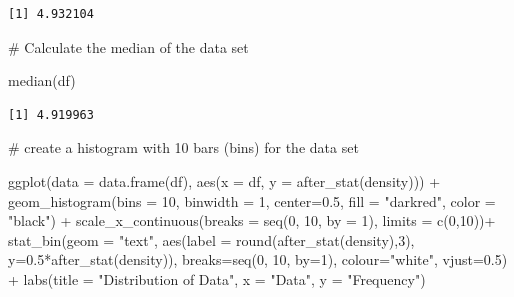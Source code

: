 \documentclass[
  letterpaper,
  DIV=11,
  numbers=noendperiod]{scrreprt}
\newenvironment{Shaded}{\begin{snugshade}}{\end{snugshade}}
\newcommand{\AttributeTok}[1]{\textcolor[rgb]{0.40,0.45,0.13}{#1}}
\newcommand{\CommentTok}[1]{\textcolor[rgb]{0.37,0.37,0.37}{#1}}
\newcommand{\DecValTok}[1]{\textcolor[rgb]{0.68,0.00,0.00}{#1}}
\newcommand{\FloatTok}[1]{\textcolor[rgb]{0.68,0.00,0.00}{#1}}
\newcommand{\FunctionTok}[1]{\textcolor[rgb]{0.28,0.35,0.67}{#1}}
\newcommand{\NormalTok}[1]{\textcolor[rgb]{0.00,0.23,0.31}{#1}}
\newcommand{\SpecialCharTok}[1]{\textcolor[rgb]{0.37,0.37,0.37}{#1}}
\newcommand{\StringTok}[1]{\textcolor[rgb]{0.13,0.47,0.30}{#1}}
\begin{document}
\begin{verbatim}
[1] 4.932104
\end{verbatim}

\begin{Shaded}
\begin{Highlighting}[]
\CommentTok{\# Calculate the median of the data set}

\FunctionTok{median}\NormalTok{(df)}
\end{Highlighting}
\end{Shaded}

\begin{verbatim}
[1] 4.919963
\end{verbatim}

\begin{Shaded}
\begin{Highlighting}[]
\CommentTok{\# create a histogram with 10 bars (bins) for the data set}

\FunctionTok{ggplot}\NormalTok{(}\AttributeTok{data =} \FunctionTok{data.frame}\NormalTok{(df), }\FunctionTok{aes}\NormalTok{(}\AttributeTok{x =}\NormalTok{ df, }\AttributeTok{y =} \FunctionTok{after\_stat}\NormalTok{(density))) }\SpecialCharTok{+}
  \FunctionTok{geom\_histogram}\NormalTok{(}\AttributeTok{bins =} \DecValTok{10}\NormalTok{, }\AttributeTok{binwidth =} \DecValTok{1}\NormalTok{, }\AttributeTok{center=}\FloatTok{0.5}\NormalTok{, }\AttributeTok{fill =} \StringTok{"darkred"}\NormalTok{, }\AttributeTok{color =} \StringTok{"black"}\NormalTok{) }\SpecialCharTok{+}
  \FunctionTok{scale\_x\_continuous}\NormalTok{(}\AttributeTok{breaks =} \FunctionTok{seq}\NormalTok{(}\DecValTok{0}\NormalTok{, }\DecValTok{10}\NormalTok{, }\AttributeTok{by =} \DecValTok{1}\NormalTok{), }\AttributeTok{limits =} \FunctionTok{c}\NormalTok{(}\DecValTok{0}\NormalTok{,}\DecValTok{10}\NormalTok{))}\SpecialCharTok{+}
    \FunctionTok{stat\_bin}\NormalTok{(}\AttributeTok{geom =} \StringTok{"text"}\NormalTok{, }\FunctionTok{aes}\NormalTok{(}\AttributeTok{label =} \FunctionTok{round}\NormalTok{(}\FunctionTok{after\_stat}\NormalTok{(density),}\DecValTok{3}\NormalTok{), }\AttributeTok{y=}\FloatTok{0.5}\SpecialCharTok{*}\FunctionTok{after\_stat}\NormalTok{(density)), }
           \AttributeTok{breaks=}\FunctionTok{seq}\NormalTok{(}\DecValTok{0}\NormalTok{, }\DecValTok{10}\NormalTok{, }\AttributeTok{by=}\DecValTok{1}\NormalTok{), }\AttributeTok{colour=}\StringTok{"white"}\NormalTok{, }\AttributeTok{vjust=}\FloatTok{0.5}\NormalTok{) }\SpecialCharTok{+}
  \FunctionTok{labs}\NormalTok{(}\AttributeTok{title =} \StringTok{"Distribution of Data"}\NormalTok{, }\AttributeTok{x =} \StringTok{"Data"}\NormalTok{, }\AttributeTok{y =} \StringTok{"Frequency"}\NormalTok{)}
\end{Highlighting}
\end{Shaded}
\end{document}
